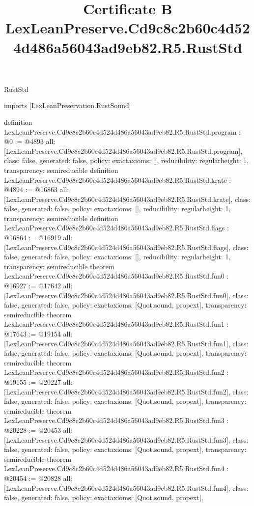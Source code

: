 \begin{lexlean}{RustStd}
\title{Certificate B LexLeanPreserve.Cd9c8c2b60c4d524d486a56043ad9eb82.R5.RustStd}
\begin{coremodule}
imports [LexLeanPreservation.RustSound]

definition LexLeanPreserve.Cd9c8c2b60c4d524d486a56043ad9eb82.R5.RustStd.program : @0 := @4893 {
  all: [LexLeanPreserve.Cd9c8c2b60c4d524d486a56043ad9eb82.R5.RustStd.program],
  class: false,
  generated: false,
  policy: exact{axioms: []},
  reducibility: regular{height: 1},
  transparency: semireducible
}
definition LexLeanPreserve.Cd9c8c2b60c4d524d486a56043ad9eb82.R5.RustStd.krate : @4894 := @16863 {
  all: [LexLeanPreserve.Cd9c8c2b60c4d524d486a56043ad9eb82.R5.RustStd.krate],
  class: false,
  generated: false,
  policy: exact{axioms: []},
  reducibility: regular{height: 1},
  transparency: semireducible
}
definition LexLeanPreserve.Cd9c8c2b60c4d524d486a56043ad9eb82.R5.RustStd.flags : @16864 := @16919 {
  all: [LexLeanPreserve.Cd9c8c2b60c4d524d486a56043ad9eb82.R5.RustStd.flags],
  class: false,
  generated: false,
  policy: exact{axioms: []},
  reducibility: regular{height: 1},
  transparency: semireducible
}
theorem LexLeanPreserve.Cd9c8c2b60c4d524d486a56043ad9eb82.R5.RustStd.fun0 : @16927 := @17642 {
  all: [LexLeanPreserve.Cd9c8c2b60c4d524d486a56043ad9eb82.R5.RustStd.fun0],
  class: false,
  generated: false,
  policy: exact{axioms: [Quot.sound, propext]},
  transparency: semireducible
}
theorem LexLeanPreserve.Cd9c8c2b60c4d524d486a56043ad9eb82.R5.RustStd.fun1 : @17643 := @19154 {
  all: [LexLeanPreserve.Cd9c8c2b60c4d524d486a56043ad9eb82.R5.RustStd.fun1],
  class: false,
  generated: false,
  policy: exact{axioms: [Quot.sound, propext]},
  transparency: semireducible
}
theorem LexLeanPreserve.Cd9c8c2b60c4d524d486a56043ad9eb82.R5.RustStd.fun2 : @19155 := @20227 {
  all: [LexLeanPreserve.Cd9c8c2b60c4d524d486a56043ad9eb82.R5.RustStd.fun2],
  class: false,
  generated: false,
  policy: exact{axioms: [Quot.sound, propext]},
  transparency: semireducible
}
theorem LexLeanPreserve.Cd9c8c2b60c4d524d486a56043ad9eb82.R5.RustStd.fun3 : @20228 := @20453 {
  all: [LexLeanPreserve.Cd9c8c2b60c4d524d486a56043ad9eb82.R5.RustStd.fun3],
  class: false,
  generated: false,
  policy: exact{axioms: [Quot.sound, propext]},
  transparency: semireducible
}
theorem LexLeanPreserve.Cd9c8c2b60c4d524d486a56043ad9eb82.R5.RustStd.fun4 : @20454 := @20828 {
  all: [LexLeanPreserve.Cd9c8c2b60c4d524d486a56043ad9eb82.R5.RustStd.fun4],
  class: false,
  generated: false,
  policy: exact{axioms: [Quot.sound, propext]},
}
\end{coremodule}
\end{lexlean}
